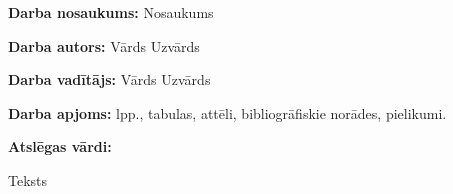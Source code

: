 \textbf{Darba nosaukums:} Nosaukums
\par \textbf{Darba autors:} Vārds Uzvārds
\par \textbf{Darba vadītājs:} Vārds Uzvārds
\par \textbf{Darba apjoms:} lpp., tabulas, attēli, bibliogrāfiskie norādes, pielikumi.
\par \textbf{Atslēgas vārdi:}


Teksts